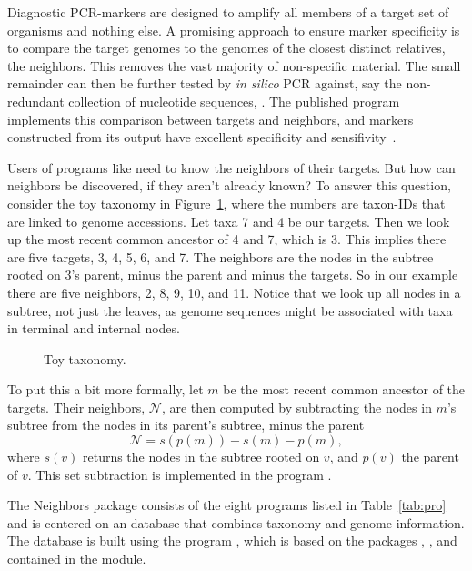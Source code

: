 Diagnostic PCR-markers are designed to amplify all members of a target
set of organisms and nothing else. A promising approach to ensure
marker specificity is to compare the target genomes to the genomes of
the closest distinct relatives, the neighbors. This removes the vast
majority of non-specific material. The small remainder can then be
further tested by \emph{in silico} PCR against, say the non-redundant
collection of nucleotide sequences, . The published
program  implements this comparison between targets and
neighbors, and markers constructed from its output have excellent
specificity and sensifivity~\cite{hau21:fur}.

Users of programs like  need to know the neighbors of their
targets. But how can neighbors be discovered, if they aren't already
known? To answer this question, consider the toy taxonomy in
Figure~\ref{fig:tax}, where the numbers are taxon-IDs that are linked
to genome accessions. Let taxa 7 and 4 be our targets. Then we look up
the most recent common ancestor of 4 and 7, which is 3. This implies
there are five targets, 3, 4, 5, 6, and 7. The neighbors are the nodes
in the subtree rooted on 3's parent, minus the parent and minus the
targets. So in our example there are five neighbors, 2, 8, 9, 10, and
11. Notice that we look up all nodes in a subtree, not just the
leaves, as genome sequences might be associated with taxa in terminal
and internal nodes.

\begin{figure}
\begin{center}

\end{center}
\caption{Toy taxonomy.}\label{fig:tax}
\end{figure}

To put this a bit more formally, let $m$ be the most recent common
ancestor of the targets. Their neighbors, $\mathcal{N}$, are then
computed by subtracting the nodes in $m$'s subtree from the nodes in
its parent's subtree, minus the parent
\begin{equation}\label{eq:nei}
\mathcal{N} = s(p(m)) - s(m) - p(m),
\end{equation}
where $s(v)$ returns the nodes in the subtree rooted on $v$, and
$p(v)$ the parent of $v$. This set subtraction is implemented in the
program .

The Neighbors package consists of the eight programs listed in
Table~\ref{tab:pro} and is centered on an  database that
combines taxonomy and genome information. The database is built using
the program , which is based on the
packages , , and  contained in the
 module.

